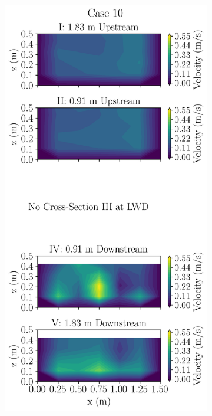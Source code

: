 \documentclass[preview, border=2pt]{standalone}
\begin{document}
\begin{figure}
\begin{subfigure}[b]{0.24\textwidth}
     \end{subfigure}
     \hfill     
     \begin{subfigure}[b]{0.24\textwidth}
         \centering
         \caption{}
         \includegraphics[width=\textwidth]{Case10_velocity_contours.png}

\end{subfigure}
\end{figure}
\end{document}
